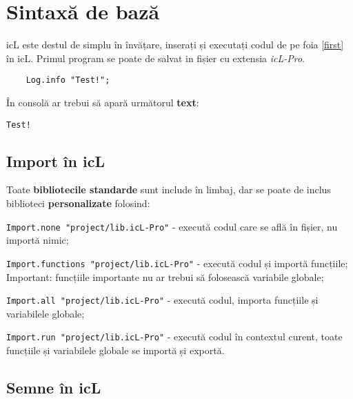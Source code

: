 

\section{Sintaxă de bază}

icL este destul de simplu în învățare, inserați și executați codul de pe foia \ref{first} în icL. Primul program se poate de salvat in fișier cu extensia \textit{icL-Pro}.

\begin{sourcecode}
    \label{first}
    \begin{verbatim}
    Log.info "Test!";
    \end{verbatim}
\end{sourcecode}

În consolă ar trebui să apară următorul \textbf{text}:

\begin{verbatim}
Test!
\end{verbatim}

\subsection{Import în icL}

Toate \textbf{bibliotecile standarde} sunt include în limbaj, dar se poate de inclus biblioteci \textbf{personalizate} folosind:

\begin{icItems}
\item
	\texttt{Import.none "project/lib.icL-Pro"} - execută codul care se află în fișier, nu importă nimic;
\item
	\texttt{Import.functions "project/lib.icL-Pro"} - execută codul și importă funcțiile; {\color{red}Important:} funcțiile importante nu ar trebui să folosească variabile globale;
\item
	\texttt{Import.all "project/lib.icL-Pro"} -  execută codul, importa funcțiile și variabilele globale;
\item
	\texttt{Import.run "project/lib.icL-Pro"} - execută codul în contextul curent, toate funcțiile și variabilele globale se importă și exportă.
\end{icItems}

\subsection{Semne în icL}

